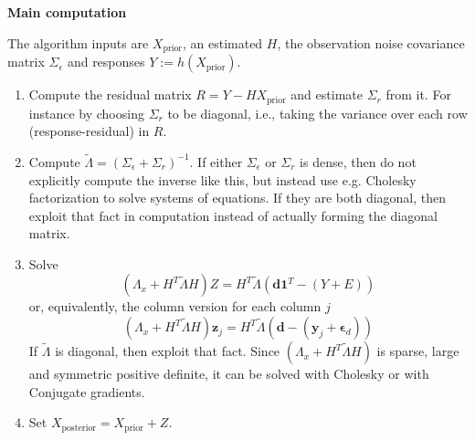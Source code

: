 \documentclass[12pt, a4paper]{article}
\theoremstyle{spaced}
\theoremstyle{spaceddef}
\numberwithin{equation}{section}
\begin{document}
\textbf{Main computation}

The algorithm inputs are $X_{\text{prior}}$, an estimated $H$, the observation noise covariance matrix $\Sigma_{\epsilon}$ and responses $Y := h(X_\text{prior})$.

\begin{enumerate}
    \item Compute the residual matrix $R = Y - HX_{\text{prior}}$ and estimate
    $\Sigma_r$ from it. For instance by choosing $\Sigma_r$ to be diagonal, i.e., taking the variance over each row (response-residual) in $R$.

    \item Compute $\tilde{\Lambda} = \left( \Sigma_{\epsilon} + \Sigma_{r} \right)^{-1}$.
    If either $\Sigma_{\epsilon}$ or $\Sigma_{r}$ is dense, then do not explicitly compute the inverse like this, but instead use e.g. Cholesky factorization to solve systems of equations.
    If they are both diagonal, then exploit that fact in computation instead of actually forming the diagonal matrix.

    \item Solve
    \begin{equation*}
        ( \Lambda_x + H^T \tilde{\Lambda} H ) Z = H^T \tilde{\Lambda}
        (\bm{d} \bm{1}^T - (Y + E))
    \end{equation*}
    or, equivalently, the column version for each column $j$
    \begin{equation*}
        ( \Lambda_x + H^T \tilde{\Lambda} H ) \bm{z}_j = H^T \tilde{\Lambda}
        (\bm{d} - (\bm{y}_j + \bm{\epsilon}_d))
    \end{equation*}
    If $\tilde{\Lambda}$ is diagonal, then exploit that fact.
    Since $( \Lambda_x + H^T \tilde{\Lambda} H )$ is sparse, large and symmetric positive definite,
    it can be solved with Cholesky or with Conjugate gradients.
    \item Set $X_{\text{posterior}}
    = X_{\text{prior}} + Z$.
\end{enumerate}


\end{document}
